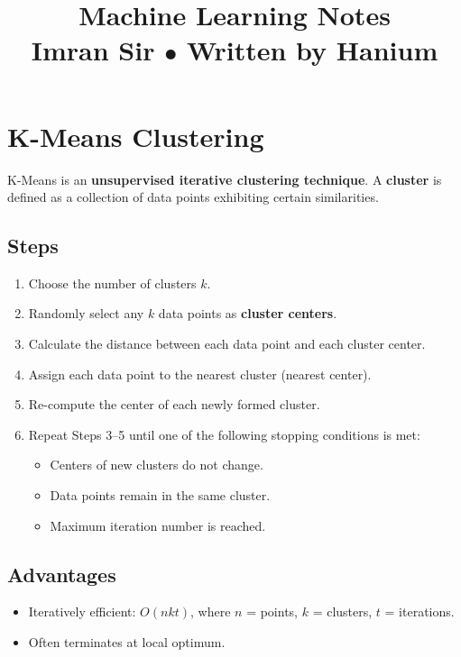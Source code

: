 \documentclass[12pt,a4paper]{article}
\title{\Huge\bfseries\color{sectioncolor} Machine Learning Notes\\[0.3em]
       \large\normalfont\color{black} Imran Sir \quad $\bullet$ \quad Written by Hanium}
\date{}
\newcommand{\keyword}[1]{\textbf{#1}}
\begin{document}
\maketitle
\tableofcontents
\newpage

\section{K-Means Clustering}

\begin{definitionbox}[Definition]
K-Means is an \keyword{unsupervised iterative clustering technique}. A \keyword{cluster} is defined as a collection of data points exhibiting certain similarities.
\end{definitionbox}

\subsection{Steps}
\begin{enumerate}[leftmargin=*, label=\textbf{Step \arabic*.}]
  \item Choose the number of clusters $k$.
  \item Randomly select any $k$ data points as \textbf{cluster centers}.
  \item Calculate the distance between each data point and each cluster center.
  \item Assign each data point to the nearest cluster (nearest center).
  \item Re-compute the center of each newly formed cluster.
  \item Repeat Steps 3--5 until one of the following stopping conditions is met:
        \begin{itemize}
          \item Centers of new clusters do not change.
          \item Data points remain in the same cluster.
          \item Maximum iteration number is reached.
        \end{itemize}
\end{enumerate}

\subsection{Advantages}
\begin{itemize}
  \item Iteratively efficient: $O(nkt)$, where $n$ = points, $k$ = clusters, $t$ = iterations.
  \item Often terminates at local optimum.
\end{itemize}
\end{document}
